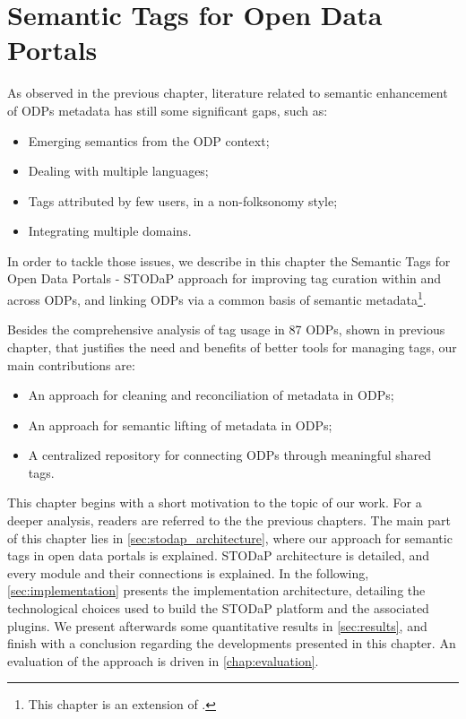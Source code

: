 \chapter{Semantic Tags for Open Data Portals}
\label{chap:tagging}

As observed in the previous chapter, literature related to semantic enhancement of ODPs metadata has still some significant gaps, such as:
\begin{itemize}
	\item Emerging semantics from the ODP context;
	\item Dealing with multiple languages;
	\item Tags attributed by few users, in a non-folksonomy style;
	\item Integrating multiple domains.
\end{itemize}

In order to	tackle those issues, we describe in this chapter the Semantic Tags for Open Data Portals - STODaP approach for improving tag curation within and across ODPs, and linking ODPs via a common basis of semantic metadata\footnote{This chapter is an extension of .}.

Besides the comprehensive analysis of tag usage in 87 ODPs, shown in previous chapter, that justifies the need and benefits of better tools for managing tags, our main contributions are:
\begin{itemize}
	\item An approach for cleaning and reconciliation of metadata in ODPs;
	\item An approach for semantic lifting of metadata in ODPs;
	\item A centralized repository for connecting ODPs through meaningful shared tags.
\end{itemize}

This chapter begins with a short motivation to the topic of our work.
For a deeper analysis, readers are referred to the the previous chapters.
The main part of this chapter lies in \autoref{sec:stodap_architecture}, where our approach for semantic tags in open data portals is explained.
STODaP architecture is detailed, and every module and their connections is explained.
In the following, \autoref{sec:implementation} presents the implementation architecture, detailing the technological choices used to build the STODaP platform and the associated plugins.
We present afterwards some quantitative results in \autoref{sec:results}, and finish with a conclusion regarding the developments presented in this chapter.
An evaluation of the approach is driven in \autoref{chap:evaluation}.

